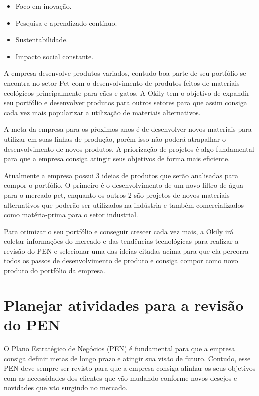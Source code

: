 \documentclass[
	12pt,				%
	openright,			%
	oneside,			%
	a4paper,			%
	english,			%
	french,				%
	spanish,			%
	brazil				%
	]{abntex2}
\begin{document}
\begin{itemize}
\item Foco em inovação.
\item Pesquisa e aprendizado contínuo.
\item Sustentabilidade.
\item Impacto social constante.
\end{itemize}

A empresa desenvolve produtos variados, contudo boa parte de seu portfólio se
encontra no setor Pet com o desenvolvimento de produtos feitos de materiais ecológicos
principalmente para cães e gatos. A Okily tem o objetivo de expandir seu portfólio e
desenvolver produtos para outros setores para que assim consiga cada vez mais popularizar a utilização de materiais alternativos.

A meta da empresa para os pŕoximos anos é de desenvolver novos materiais para
utilizar em suas linhas de produção, porém isso não poderá atrapalhar o desenvolvimento
de novos produtos. A priorização de projetos é algo fundamental para que a empresa
consiga atingir seus objetivos de forma mais eficiente.

Atualmente a empresa possui 3 ideias de produtos que serão analisadas para compor o portfólio. O primeiro é o desenvolvimento de um novo filtro de água para o mercado pet, enquanto os outros 2 são projetos de novos materiais alternativos que poderão ser utilizados na indústria e também comercializados como matéria-prima para o setor industrial. 

Para otimizar o seu portfólio e conseguir crescer cada vez mais, a Okily irá coletar informações do mercado e das tendências tecnológicas para realizar a revisão do PEN e selecionar uma das ideias citadas acima para que ela percorra todos os passos de desenvolvimento de produto e consiga compor como novo produto do portfólio da empresa.

\section{Planejar atividades para a revisão do PEN}

O Plano Estratégico de Negócios (PEN) é fundamental para que a empresa consiga definir metas de longo prazo e atingir sua visão de futuro. Contudo, esse PEN deve sempre ser revisto para que a empresa consiga alinhar os seus objetivos com as necessidades dos clientes que vão mudando conforme novos desejos e novidades que vão surgindo no mercado.
\end{document}
